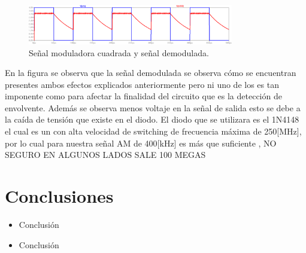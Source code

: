\documentclass[letterpaper, titlepage]{article}
\begin{document}
\begin{enumerate}
\begin{figure}[H]
  \centering
    \includegraphics[width=0.8\textwidth]{graficodemod}
  \caption{Señal moduladora cuadrada y señal demodulada.}
  \label{fig:ejemplo}
\end{figure}

En la figura se observa  que la señal demodulada  se observa cómo se encuentran presentes ambos efectos explicados anteriormente pero ni uno de los es tan imponente como para afectar la finalidad del circuito que es la detección de envolvente. Además se observa menos voltaje en la señal de salida esto se debe a la caída de tensión que existe en el diodo.
\newpage
El diodo que se utilizara es el 1N4148 el cual es un con alta velocidad de switching de frecuencia máxima de 250[MHz], por lo cual para nuestra señal AM de 400[kHz] es más que suficiente , NO SEGURO EN ALGUNOS LADOS SALE 100 MEGAS   
\end{enumerate}
\newpage



\section{Conclusiones}
	\begin{itemize}
		\item Conclusión
		\item Conclusión
	\end{itemize}
\end{document}
